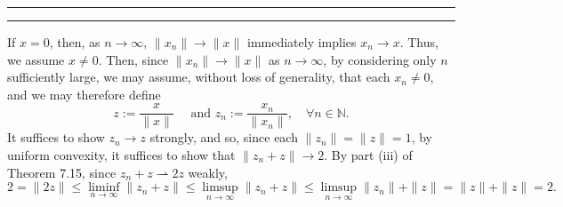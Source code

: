 \documentclass[11pt]{article}
\newcounter{questionCounter}
\newcounter{partCounter}[questionCounter]
\newenvironment{question}[2][\arabic{questionCounter}]{%
    \setcounter{partCounter}{0}%
    \vspace{.25in} \hrule \vspace{0.5em}%
        \noindent{\bf #2}%
    \vspace{0.8em} \hrule \vspace{.10in}%
    \addtocounter{questionCounter}{1}%
}{}
\newcommand{\N}{\mathbb{N}} %
\newcommand{\wto}{\rightharpoonup} %
\begin{document}
\begin{question}{Problem 8}
If $x = 0$, then, as $n \to \infty$, $\|x_n\| \to \|x\|$ immediately implies
$x_n \to x$. Thus, we assume $x \neq 0$. Then, since $\|x_n\| \to \|x\|$ as
$n \to \infty$, by considering only $n$ sufficiently large, we may assume,
without loss of generality, that each $x_n \neq 0$, and we may therefore define
\[z := \frac{x}{\|x\|} \quad \mbox{ and } z_n := \frac{x_n}{\|x_n\|},
    \quad \forall n \in \N.
\]
It suffices to show $z_n \to z$ strongly, and so, since each
$\|z_n\| = \|z\| = 1$, by uniform convexity, it suffices to show that
$\|z_n + z\| \to 2$. By part (iii) of Theorem 7.15, since $z_n + z \wto 2z$ weakly,
\[2
    = \|2z\|
    \leq \liminf_{n \to \infty} \|z_n + z\|
    \leq \limsup_{n \to \infty} \|z_n + z\|
    \leq \limsup_{n \to \infty} \|z_n\| + \|z\|
    = \|z\| + \|z\|
    = 2.
\]
\vspace{-0.3in}
\end{question}
\end{document}
